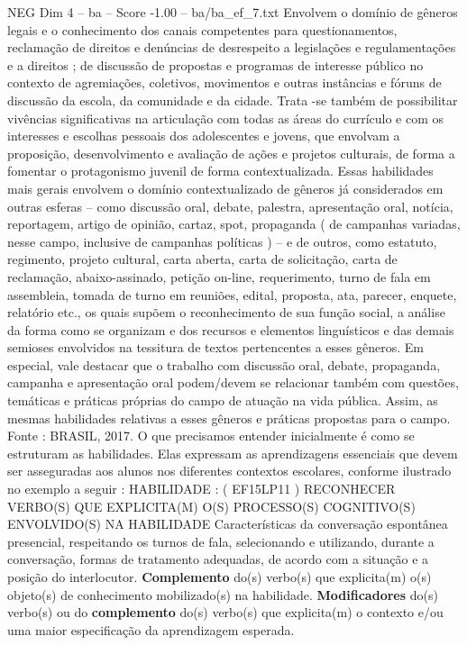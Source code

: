 \begin{textsample}{NEG Dim 4 – ba – Score -1.00 – ba/ba\_ef\_7.txt}
Envolvem o domínio de gêneros legais e o conhecimento dos canais competentes para questionamentos, reclamação de direitos e denúncias de desrespeito a legislações e regulamentações e a direitos ; de discussão de propostas e programas de interesse público no contexto de agremiações, coletivos, movimentos e outras instâncias e fóruns de discussão da escola, da comunidade e da cidade.
Trata -se também de possibilitar vivências significativas na articulação com todas as áreas do currículo e com os interesses e escolhas pessoais dos adolescentes e jovens, que envolvam a proposição, desenvolvimento e avaliação de ações e projetos culturais, de forma a fomentar o protagonismo juvenil de forma contextualizada.
Essas habilidades mais gerais envolvem o domínio contextualizado de gêneros já considerados em outras esferas – como discussão oral, debate, palestra, apresentação oral, notícia, reportagem, artigo de opinião, cartaz, spot, propaganda ( de campanhas variadas, nesse campo, inclusive de campanhas políticas ) – e de outros, como estatuto, regimento, projeto cultural, carta aberta, carta de solicitação, carta de reclamação, abaixo-assinado, petição on-line, requerimento, turno de fala em assembleia, tomada de turno em reuniões, edital, proposta, ata, parecer, enquete, relatório etc., os quais supõem o reconhecimento de sua função social, a análise da forma como se organizam e dos recursos e elementos linguísticos e das demais semioses envolvidos na tessitura de textos pertencentes a esses gêneros.
Em especial, vale destacar que o trabalho com discussão oral, debate, propaganda, campanha e apresentação oral podem/devem se relacionar também com questões, temáticas e práticas próprias do campo de atuação na vida pública.
Assim, as mesmas habilidades relativas a esses gêneros e práticas propostas para o campo.
Fonte : BRASIL, 2017.
O que precisamos entender inicialmente é como se estruturam as habilidades.
Elas expressam as aprendizagens essenciais que devem ser asseguradas aos alunos nos diferentes contextos escolares, conforme ilustrado no exemplo a seguir : HABILIDADE : ( EF15LP11 ) RECONHECER VERBO(S) QUE EXPLICITA(M) O(S) PROCESSO(S) COGNITIVO(S) ENVOLVIDO(S) NA HABILIDADE Características da conversação espontânea presencial, respeitando os turnos de fala, selecionando e utilizando, durante a conversação, formas de tratamento adequadas, de acordo com a situação e a posição do interlocutor. \textbf{Complemento} do(s) verbo(s) que explicita(m) o(s) objeto(s) de conhecimento mobilizado(s) na habilidade. \textbf{Modificadores} do(s) verbo(s) ou do \textbf{complemento} do(s) verbo(s) que explicita(m) o contexto e/ou uma maior especificação da aprendizagem esperada.

\end{textsample}
